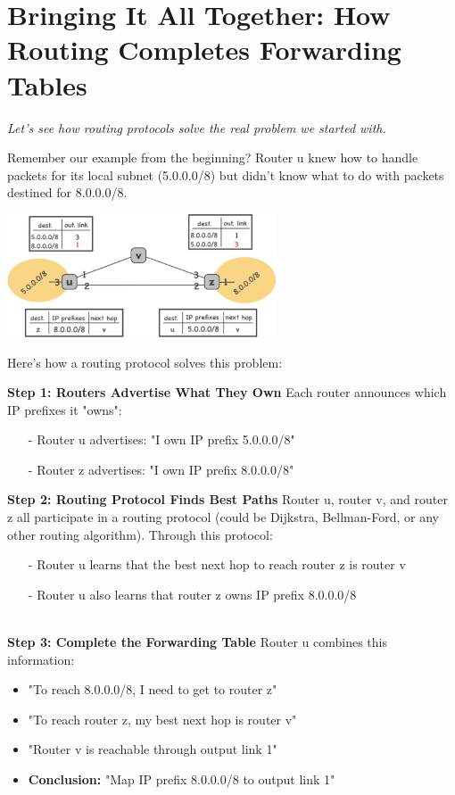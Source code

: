 \documentclass[../../compsys.tex]{subfiles}
\begin{document}
\section{Bringing It All Together: How Routing Completes Forwarding Tables}
\textit{Let's see how routing protocols solve the real problem we started with.}

Remember our example from the beginning? Router u knew how to handle packets for its local subnet (5.0.0.0/8) but didn't know what to do with packets destined for 8.0.0.0/8.

\begin{center}
    \includegraphics[width=0.6\textwidth]{images/example.png}
\end{center}

Here's how a routing protocol solves this problem:\\
\begin{minipage}[htp]{0.5\textwidth}
    \textbf{Step 1: Routers Advertise What They Own}
    Each router announces which IP prefixes it "owns":
    \begin{itemize}
        \item[-] Router u advertises: "I own IP prefix 5.0.0.0/8"
        \item[-] Router z advertises: "I own IP prefix 8.0.0.0/8"
    \end{itemize}
    \end{minipage}
    \begin{minipage}[htp]{0.5\textwidth}
 \textbf{Step 2: Routing Protocol Finds Best Paths}
    Router u, router v, and router z all participate in a routing protocol (could be Dijkstra, Bellman-Ford, or any other routing algorithm). Through this protocol:
    \begin{itemize}
        \item[-] Router u learns that the best next hop to reach router z is router v
        \item[-] Router u also learns that router z owns IP prefix 8.0.0.0/8
    \end{itemize}
    \end{minipage}\\ 
    \textbf{Step 3: Complete the Forwarding Table}
Router u combines this information:
\begin{itemize}
    \item "To reach 8.0.0.0/8, I need to get to router z"
    \item "To reach router z, my best next hop is router v"
    \item "Router v is reachable through output link 1"
    \item \textbf{Conclusion:} "Map IP prefix 8.0.0.0/8 to output link 1"
\end{itemize}
\end{document}
